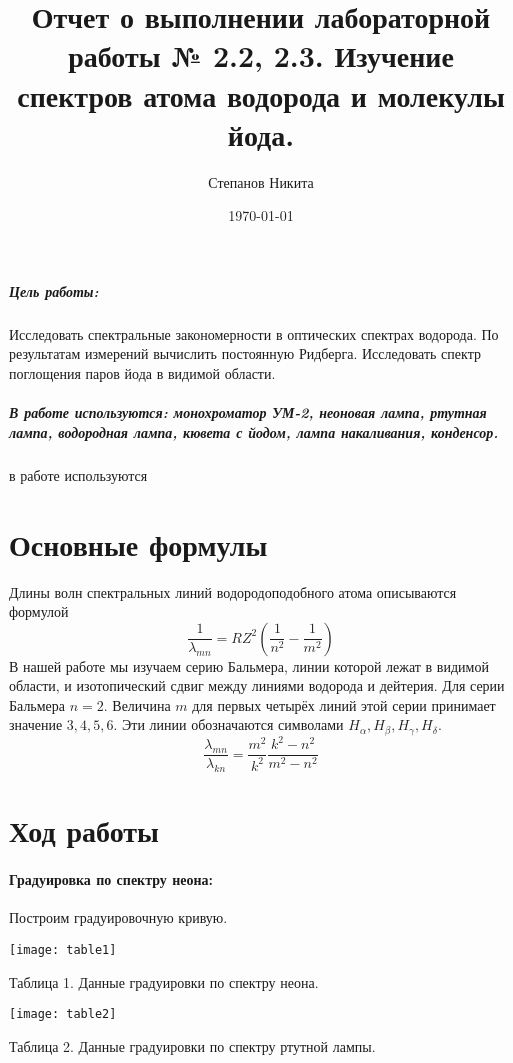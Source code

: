 \documentclass[a4paper,12pt]{article} %
\author{Степанов Никита}
\title{Отчет о выполнении лабораторной работы № 2.2, 2.3. Изучение спектров атома водорода и молекулы йода.}
\date{\today}
\begin{document}

\maketitle
\newpage

{\small \subparagraph{{\small Цель работы:}}
Исследовать спектральные закономерности в оптических спектрах водорода. По результатам измерений вычислить постоянную Ридберга. Исследовать спектр поглощения паров йода в видимой области.
}

{\small \subparagraph{{\small В работе используются: монохроматор УМ-2, неоновая лампа, ртутная лампа, водородная лампа, кювета с йодом, лампа накаливания, конденсор.}}
в работе используются
}


\section*{Основные формулы}
Длины волн спектральных линий водородоподобного атома описываются формулой
\begin{equation}
\frac{1}{\lambda_{mn}} = RZ^2\left(\frac{1}{n^2}-\frac{1}{m^2}\right)
\end{equation}
В нашей работе мы изучаем серию Бальмера, линии которой лежат в видимой области, и изотопический сдвиг между линиями водорода и дейтерия. Для серии Бальмера $n=2$. Величина $m$ для первых четырёх линий этой серии принимает значение $3, 4, 5, 6$. Эти линии обозначаются символами $H_{\alpha},
 H{_\beta}, H_{\gamma}, H_{\delta}$.
\begin{equation}
\frac{\lambda_{mn}}{\lambda_{kn}} = \frac{m^2}{k^2}\frac{k^2-n^2}{m^2-n^2}
\end{equation} 
 
 
\section*{Ход работы}

\paragraph*{Градуировка по спектру неона:}
Построим градуировочную кривую.
\begin{center}
\texttt{[image: table1]}

Таблица 1. Данные градуировки по спектру неона.
\end{center}

\begin{center}
\texttt{[image: table2]}

Таблица 2. Данные градуировки по спектру ртутной лампы.
\end{center}
\end{document}
